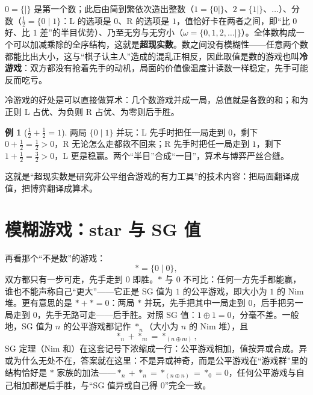 \documentclass[UTF8,a4paper,11pt,oneside,openany,fontset=fandol]{ctexbook}
\theoremstyle{definition}
\newtheorem{example}[definition]{例}
\begin{document}
$0=\{\mid\}$ 是第一个数；此后由简到繁依次造出整数（$1=\{0\mid\}$、$2=\{1\mid\}$、$\ldots$）、分数（$\tfrac12=\{0\mid 1\}$：L 的选项是 $0$、R 的选项是 $1$，值恰好卡在两者之间，即“比 $0$ 好、比 $1$ 差”的半目优势）、乃至无穷与无穷小（$\omega=\{0,1,2,\ldots\mid\}$）。全体数构成一个可以加减乘除的全序结构，这就是\textbf{超现实数}。数之间没有模糊性——任意两个数都能比出大小，这与“棋子认主人”造成的混乱正相反，因此取值是数的游戏也叫\textbf{冷游戏}：双方都没有抢着先手的动机，局面的价值像温度计读数一样稳定，先手可能反而吃亏。

冷游戏的好处是可以直接做算术：几个数游戏并成一局，总值就是各数的和；和为正则 L 占优、为负则 R 占优、为零则后手胜。

\begin{example}[$\tfrac12+\tfrac12=1$]
两局 $\{0\mid 1\}$ 并玩：L 先手时把任一局走到 $0$，剩下 $0+\tfrac12=\tfrac12>0$，R 无论怎么走都救不回来；R 先手时把任一局走到 $1$，剩下 $1+\tfrac12=\tfrac32>0$，L 更是稳赢。两个“半目”合成“一目”，算术与博弈严丝合缝。
\end{example}

这就是“超现实数是研究非公平组合游戏的有力工具”的技术内容：把局面翻译成值，把博弈翻译成算术。

\section{模糊游戏：star 与 SG 值}
再看那个“不是数”的游戏：
\[
 \ast=\{0\mid 0\},
\]
双方都只有一步可走，先手走到 $0$ 即胜。$\ast$ 与 $0$ 不可比：任何一方先手都能赢，谁也不能声称自己“更大”——它正是 SG 值为 $1$ 的公平游戏，即大小为 $1$ 的 Nim 堆。更有意思的是 $\ast+\ast=0$：两局 $\ast$ 并玩，先手把其中一局走到 $0$，后手把另一局走到 $0$，先手无路可走——后手胜。对照 SG 值：$1\oplus1=0$，分毫不差。一般地，SG 值为 $n$ 的公平游戏都记作 $\ast_n$（大小为 $n$ 的 Nim 堆），且
\[
 \ast_n+\ast_m=\ast_{(n\oplus m)},
\]
SG 定理（Nim 和）在这套记号下浓缩成一行：公平游戏相加，值按异或合成。异或为什么无处不在，答案就在这里：不是异或神奇，而是公平游戏在“游戏群”里的结构恰好是 $\ast$ 家族的加法——$\ast_n+\ast_n=\ast_{(n\oplus n)}=\ast_0=0$，任何公平游戏与自己相加都是后手胜，与“SG 值异或自己得 $0$”完全一致。
\end{document}
